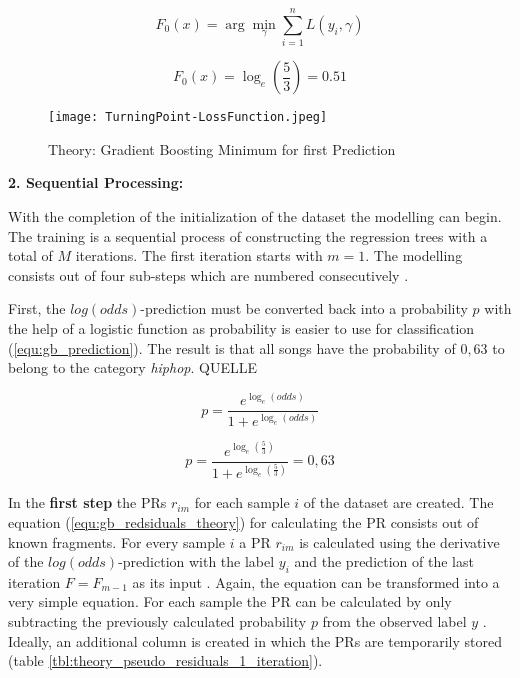\begin{equation}
    F_{0}(x) = \arg \min_{\gamma } \sum_{i= 1}^{n} L(y_{i}, \gamma)
    \label{equ:gb_initial_prediciton}
\end{equation}

\begin{equation*}
    F_{0}(x) = \log_{e}(\frac{5}{3}) = 0.51
\end{equation*}

\begin{figure}[H]
    \centering
    \caption[]{Theory: Gradient Boosting Minimum for first Prediction}
	\label{fig:gb_turning_point-loss_function}
    \texttt{[image: TurningPoint-LossFunction.jpeg]}
\end{figure}

\textbf{2. Sequential Processing:}

With the completion of the initialization of the dataset the modelling can begin. The training is a sequential 
process of constructing the regression trees with a total of \(M\) iterations. The first iteration 
starts with \(m = 1\). The modelling consists out of four sub-steps which are numbered consecutively \cite[p.1198]{Friedman_2001}.

First, the \(log(odds)\)-prediction must be converted back into a probability \(p\) with the help of a 
logistic function as probability is easier to use for classification (\ref{equ:gb_prediction}). The result is 
that all songs have the probability of \(0,63\) to belong to the category \emph{hiphop}. QUELLE

\begin{equation}
    p = \frac{e^{\log_{e}(odds)}}{1 + e^{\log_{e}(odds)}} 
    \label{equ:gb_prediction}
\end{equation}

\begin{equation*}
    p = \frac{e^{\log_{e}(\frac{5}{3})}}{1 + e^{\log_{e}(\frac{5}{3})}} = 0,63
\end{equation*}

In the \textbf{first step} the \ac{PR}s \(r_{im}\) for each sample \(i\) of the dataset are created. The equation (\ref{equ:gb_redsiduals_theory}) 
for calculating the \ac{PR} consists out of known fragments. For every sample \(i\) a PR \(r_{im}\) 
is calculated using the derivative of the \(log(odds)\)-prediction with the label \(y_{i}\) and the 
prediction of the last iteration \(F = F_{m - 1}\) as its input \cite[p.361]{Hastie_2009}. Again, the equation can be 
transformed into a very simple equation. For each sample the \ac{PR} can be calculated by only 
subtracting the previously calculated probability \(p\) from the observed label \(y\) \cite{parr2022gb_explained_hrd} \cite{parr2022gb_explained_gbd}. Ideally, an additional 
column is created in which the PRs are temporarily stored (table \ref{tbl:theory_pseudo_residuals_1_iteration}). 

